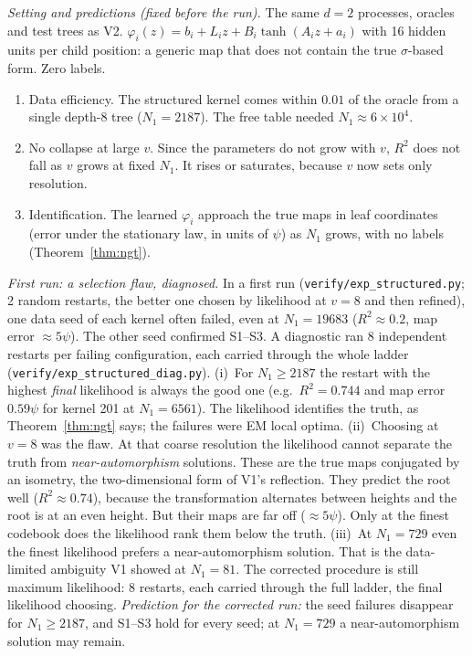 \documentclass[11pt]{article}
\theoremstyle{definition}
\begin{document}
\emph{Setting and predictions (fixed before the run).} The same $d=2$ processes, oracles and test trees as V2.
$\varphi_i(z)=b_i+L_iz+B_i\tanh(A_iz+a_i)$ with 16 hidden units per child position: a generic map that does
not contain the true $\sigma$-based form. Zero labels.
\begin{enumerate}
\item[(S1)] Data efficiency. The structured kernel comes within $0.01$ of the oracle from a single
depth-8 tree ($N_1=2187$). The free table needed $N_1\approx6\times10^4$.
\item[(S2)] No collapse at large $v$. Since the parameters do not grow with $v$, $R^2$ does not fall as $v$
grows at fixed $N_1$. It rises or saturates, because $v$ now sets only resolution.
\item[(S3)] Identification. The learned $\varphi_i$ approach the true maps in leaf coordinates (error under
the stationary law, in units of $\psi$) as $N_1$ grows, with no labels (Theorem~\ref{thm:ngt}).
\end{enumerate}

\emph{First run: a selection flaw, diagnosed.} In a first run (\texttt{verify/exp\_structured.py}; 2 random
restarts, the better one chosen by likelihood at $v=8$ and then refined), one data seed of each kernel
often failed, even at $N_1=19683$ ($R^2\approx0.2$, map error $\approx5\psi$). The other seed confirmed S1--S3.
A diagnostic ran 8 independent restarts per failing configuration, each carried through the whole ladder
(\texttt{verify/exp\_structured\_diag.py}). (i)~For $N_1\ge2187$ the restart with the highest
\emph{final} likelihood is always the good one (e.g.\ $R^2=0.744$ and map error $0.59\psi$ for kernel 201
at $N_1=6561$). The likelihood identifies the truth, as Theorem~\ref{thm:ngt} says; the failures were
EM local optima. (ii)~Choosing at $v=8$ was the flaw. At that coarse resolution the likelihood cannot
separate the truth from \emph{near-automorphism} solutions. These are the true maps conjugated by an
isometry, the two-dimensional form of V1's reflection. They predict the root well ($R^2\approx0.74$), because
the transformation alternates between heights and the root is at an even height. But their maps are
far off ($\approx5\psi$). Only at the finest codebook does the likelihood rank them below the truth.
(iii)~At $N_1=729$ even the finest likelihood prefers a near-automorphism solution. That is the
data-limited ambiguity V1 showed at $N_1=81$. The corrected procedure is still maximum likelihood: 8
restarts, each carried through the full ladder, the final likelihood choosing.
\emph{Prediction for the corrected run:} the seed failures disappear for $N_1\ge2187$, and S1--S3 hold for
every seed; at $N_1=729$ a near-automorphism solution may remain.
\end{document}
